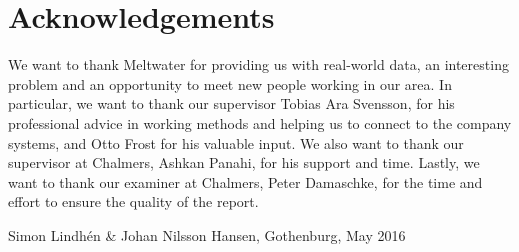\thispagestyle{plain}			%
\section*{Acknowledgements}
We want to thank Meltwater for providing us with real-world data, an interesting problem and an opportunity to meet new people working in our area. In particular, we want to thank our supervisor Tobias Ara Svensson, for his professional advice in working methods and helping us to connect to the company systems, and Otto Frost for his valuable input. We also want to thank our supervisor at Chalmers, Ashkan Panahi, for his support and time. Lastly, we want to thank our examiner at Chalmers, Peter Damaschke, for the time and effort to ensure the quality of the report.

\vspace{1.5cm}
\hfill
Simon Lindhén \& Johan Nilsson Hansen, Gothenburg, May 2016

\newpage				%
\thispagestyle{empty}
\mbox{}